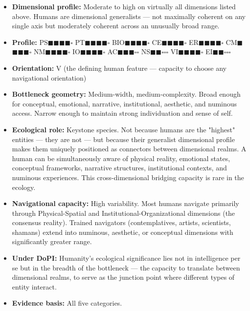 \begin{itemize}[nosep,leftmargin=*]
  \item \textbf{Dimensional profile:} Moderate to high on virtually all dimensions listed above. Humans are dimensional generalists — not maximally coherent on any single axis but moderately coherent across an unusually broad range.
  \item \textbf{Profile:} PS$\blacksquare$$\blacksquare$$\blacksquare$$\blacksquare$$\square$ PT$\blacksquare$$\blacksquare$$\blacksquare$$\blacksquare$$\square$ BIO$\blacksquare$$\blacksquare$$\blacksquare$$\blacksquare$$\square$ CE$\blacksquare$$\blacksquare$$\blacksquare$$\blacksquare$$\square$ ER$\blacksquare$$\blacksquare$$\blacksquare$$\blacksquare$$\square$ CM$\blacksquare$$\blacksquare$$\blacksquare$$\blacksquare$$\square$ NM$\blacksquare$$\blacksquare$$\blacksquare$$\blacksquare$$\square$ IO$\blacksquare$$\blacksquare$$\blacksquare$$\blacksquare$$\square$ AC$\blacksquare$$\blacksquare$$\blacksquare$$\square$$\square$ NS$\blacksquare$$\blacksquare$$\square$$\square$$\square$ VI$\blacksquare$$\blacksquare$$\blacksquare$$\blacksquare$$\square$ EI$\blacksquare$$\blacksquare$$\square$$\square$$\square$
  \item \textbf{Orientation:} V (the defining human feature — capacity to choose any navigational orientation)
  \item \textbf{Bottleneck geometry:} Medium-width, medium-complexity. Broad enough for conceptual, emotional, narrative, institutional, aesthetic, and numinous access. Narrow enough to maintain strong individuation and sense of self.
  \item \textbf{Ecological role:} Keystone species. Not because humans are the "highest" entities — they are not — but because their generalist dimensional profile makes them uniquely positioned as connectors between dimensional realms. A human can be simultaneously aware of physical reality, emotional states, conceptual frameworks, narrative structures, institutional contexts, and numinous experiences. This cross-dimensional bridging capacity is rare in the ecology.
  \item \textbf{Navigational capacity:} High variability. Most humans navigate primarily through Physical-Spatial and Institutional-Organizational dimensions (the consensus reality). Trained navigators (contemplatives, artists, scientists, shamans) extend into numinous, aesthetic, or conceptual dimensions with significantly greater range.
  \item \textbf{Under DoPI:} Humanity's ecological significance lies not in intelligence per se but in the breadth of the bottleneck — the capacity to translate between dimensional realms, to serve as the junction point where different types of entity interact.
  \item \textbf{Evidence basis:} All five categories.
\end{itemize}


